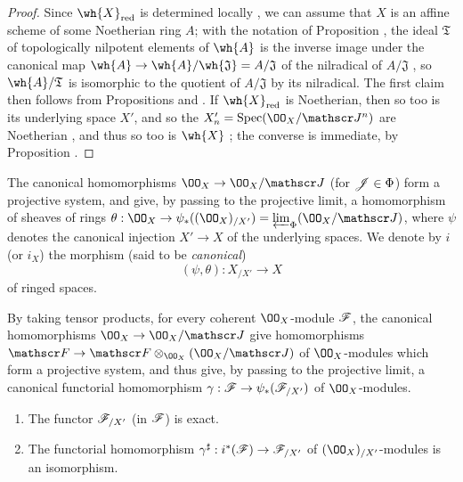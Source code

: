\begin{proof}
\label{proof-1.10.8.6}
Since $\wh{X}_\red$ is determined locally , we can assume that $X$ is an affine scheme of some Noetherian ring $A$; with the notation of Proposition , the ideal $\mathfrak{T}$ of topologically nilpotent elements of $\wh{A}$ is the inverse image under the canonical map $\wh{A}\to\wh{A}/\wh{\mathfrak{J}}=A/\mathfrak{J}$ of the nilradical of $A/\mathfrak{J}$ , so $\wh{A}/\mathfrak{T}$ is isomorphic to the quotient of $A/\mathfrak{J}$ by its nilradical.
The first claim then follows from Propositions  and .
If $\wh{X}_\red$ is Noetherian, then so too is its underlying space $X'$, and so the $X_n'=\Spec(\OO_X/\sh{J}^n)$ are Noetherian , and thus so too is $\wh{X}$ ; the converse is immediate, by Proposition .
\end{proof}

\begin{env}[10.8.7]
\label{1.10.8.7}
The canonical homomorphisms $\OO_X\to\OO_X/\sh{J}$ (for $\mathscr{J}\in\Phi$) form a projective system, and give, by passing to the projective limit, a homomorphism of sheaves of rings $\theta:\OO_X\to\psi_*((\OO_X)_{/X'})=\varprojlim_\Phi(\OO_X/\sh{J})$, where $\psi$ denotes the canonical injection $X'\to X$ of the underlying spaces.
We denote by $i$ (or $i_X$) the morphism (said to be \emph{canonical})
\[
  (\psi,\theta):X_{/X'}\to X
\]
of ringed spaces.

By taking tensor products, for every coherent $\OO_X$-module $\mathscr{F}$, the canonical homomorphisms $\OO_X\to\OO_X/\sh{J}$ give homomorphisms $\sh{F}\to\sh{F}\otimes_{\OO_X}(\OO_X/\sh{J})$ of $\OO_X$-modules which form a projective system, and thus give, by passing to the projective limit, a canonical functorial homomorphism $\gamma:\sh{F}\to\psi_*(\sh{F}_{/X'})$ of $\OO_X$-modules.
\end{env}

\begin{prop}[10.8.8]
\label{1.10.8.8}
\medskip\noindent
\begin{enumerate}[label=\emph{(\roman*)}]
  \item The functor $\mathscr{F}_{/X'}$ (in $\mathscr{F}$) is exact.
  \item The functorial homomorphism $\gamma^\sharp:i^*(\sh{F})\to\sh{F}_{/X'}$ of $(\OO_X)_{/X'}$-modules is an isomorphism.
\end{enumerate}
\end{prop}

